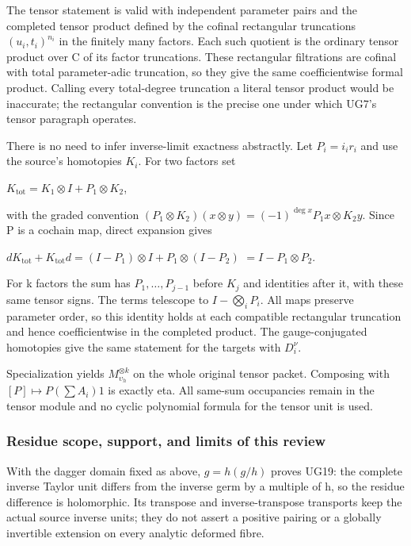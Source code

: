 The tensor statement is valid with independent parameter pairs and the completed tensor product defined by the cofinal rectangular truncations \((u_i,t_i)^{n_i}\) in the finitely many factors. Each such quotient is the ordinary tensor product over C of its factor truncations. These rectangular filtrations are cofinal with total parameter-adic truncation, so they give the same coefficientwise formal product. Calling every total-degree truncation a literal tensor product would be inaccurate; the rectangular convention is the precise one under which UG7's tensor paragraph operates.

There is no need to infer inverse-limit exactness abstractly. Let \(P_i=i_i r_i\) and use the source's homotopies \(K_i\). For two factors set

\(K_{\mathrm{tot}}=K_1\otimes I+P_1\otimes K_2\),

with the graded convention \((P_1\otimes K_2)(x\otimes y)=(-1)^{\deg x}P_1x\otimes K_2y\). Since P is a cochain map, direct expansion gives

\(dK_{\mathrm{tot}}+K_{\mathrm{tot}}d=(I-P_1)\otimes I+P_1\otimes(I-P_2)\) \(=I-P_1\otimes P_2\).

For k factors the sum has \(P_1,\ldots,P_{j-1}\) before \(K_j\) and identities after it, with these same tensor signs. The terms telescope to \(I-\bigotimes_i P_i\). All maps preserve parameter order, so this identity holds at each compatible rectangular truncation and hence coefficientwise in the completed product. The gauge-conjugated homotopies give the same statement for the targets with \(D_i^\nu\).

Specialization yields \(M_{\upsilon_h}^{\otimes k}\) on the whole original tensor packet. Composing with \([P]\mapsto P(\sum A_i)1\) is exactly eta. All same-sum occupancies remain in the tensor module and no cyclic polynomial formula for the tensor unit is used.

\subsubsection{Residue scope, support, and limits of this review}\label{endpoint-f1_unit_gauge_review--residue-scope-support-and-limits-of-this-review}

With the dagger domain fixed as above, \(g=h(g/h)\) proves UG19: the complete inverse Taylor unit differs from the inverse germ by a multiple of h, so the residue difference is holomorphic. Its transpose and inverse-transpose transports keep the actual source inverse units; they do not assert a positive pairing or a globally invertible extension on every analytic deformed fibre.

